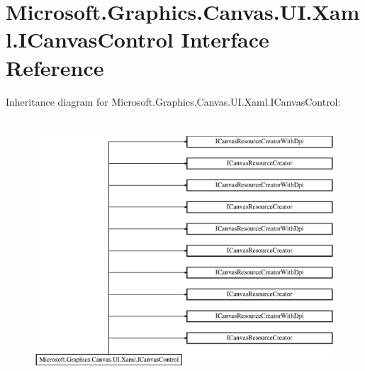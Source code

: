 \hypertarget{interface_microsoft_1_1_graphics_1_1_canvas_1_1_u_i_1_1_xaml_1_1_i_canvas_control}{}\section{Microsoft.\+Graphics.\+Canvas.\+U\+I.\+Xaml.\+I\+Canvas\+Control Interface Reference}
\label{interface_microsoft_1_1_graphics_1_1_canvas_1_1_u_i_1_1_xaml_1_1_i_canvas_control}
Inheritance diagram for Microsoft.\+Graphics.\+Canvas.\+U\+I.\+Xaml.\+I\+Canvas\+Control\+:\begin{figure}[H]
\begin{center}
\leavevmode
\includegraphics[height=9.840256cm]{interface_microsoft_1_1_graphics_1_1_canvas_1_1_u_i_1_1_xaml_1_1_i_canvas_control}
\end{center}
\end{figure}
